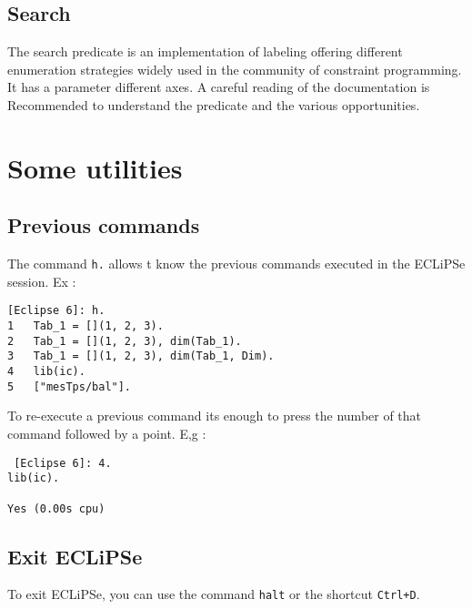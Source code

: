 \subsection{Search}

The search predicate is an implementation of labeling offering
different enumeration strategies widely used in the community
of constraint programming. It has a parameter
different axes. A careful reading of the documentation is
Recommended to understand the predicate and the various
opportunities.



\section{Some utilities}

\subsection{Previous commands}
The command  \verb|h.| allows t know the previous commands executed in the ECLiPSe session. Ex :
\begin{verbatim}
[Eclipse 6]: h.
1	Tab_1 = [](1, 2, 3).
2	Tab_1 = [](1, 2, 3), dim(Tab_1).
3	Tab_1 = [](1, 2, 3), dim(Tab_1, Dim).
4	lib(ic).
5	["mesTps/bal"].
\end{verbatim}
To re-execute a previous command its enough to press the number of that command followed by a point. E,g :
\begin{verbatim}
 [Eclipse 6]: 4.
lib(ic).

Yes (0.00s cpu)
\end{verbatim}

\subsection{Exit ECLiPSe}
To exit ECLiPSe, you can use the command \verb|halt| or the shortcut \verb|Ctrl+D|.


